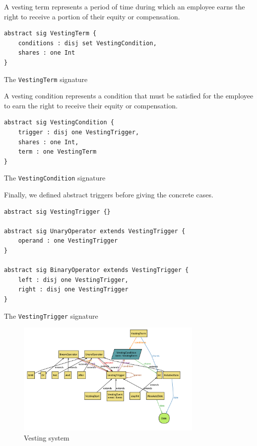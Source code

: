 A vesting term represents a period of time during which an employee earns the right to receive a portion of their equity or compensation.

\begin{listing}[!h]
\begin{verbatim}
abstract sig VestingTerm {
    conditions : disj set VestingCondition,
    shares : one Int
}
\end{verbatim}
\caption{The \texttt{VestingTerm} signature}
\label{lst:vesting-term-signature-3}
\end{listing}


A vesting condition represents a condition that must be satisfied for the employee to earn the right to receive their equity or compensation.

\begin{listing}[!h]
\begin{verbatim}
abstract sig VestingCondition {
    trigger : disj one VestingTrigger,
    shares : one Int,
    term : one VestingTerm
}
\end{verbatim}
\caption{The \texttt{VestingCondition} signature}
\label{lst:vesting-condition-signature-3}
\end{listing}


Finally, we defined abstract triggers before giving the concrete cases.

\begin{listing}[!h]
\begin{verbatim}
abstract sig VestingTrigger {}

abstract sig UnaryOperator extends VestingTrigger {
    operand : one VestingTrigger
}

abstract sig BinaryOperator extends VestingTrigger {
    left : disj one VestingTrigger,
    right : disj one VestingTrigger
}
\end{verbatim}
\caption{The \texttt{VestingTrigger} signature}
\label{lst:vesting-trigger-signature-3}
\end{listing}


\begin{figure}[ht]
\centering
\includegraphics[width=0.8\textwidth]{pics/vesting-system.png}
\caption{Vesting system}
\label{fig:vesting-system}
\end{figure}

